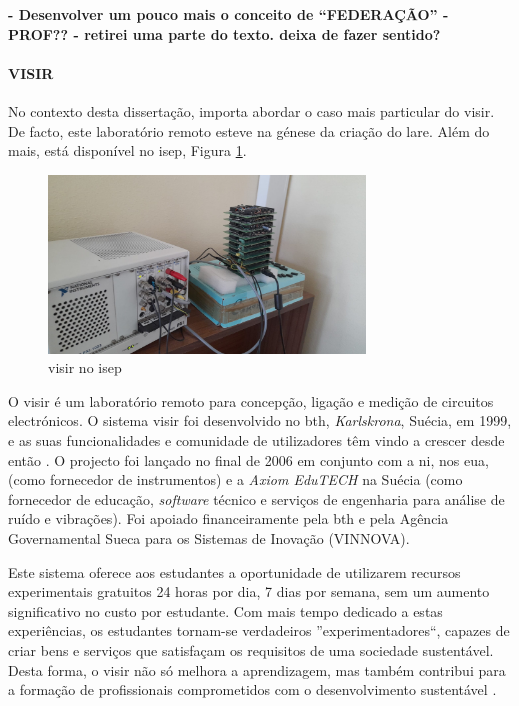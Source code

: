 \textbf{- Desenvolver um pouco mais o conceito de ``FEDERAÇÃO'' - PROF?? - retirei uma parte do texto. deixa de fazer sentido?}

\paragraph{VISIR}
\label{sec:visir}
No contexto desta dissertação, importa abordar o caso mais particular do \acrshort{visir}. De facto, este \acrshort{laboratório remoto} esteve na génese da criação do \acrshort{lare}. Além do mais, está disponível no \acrshort{isep}, Figura \ref{fig:visirISEP}. 

\begin{figure}[hbtp]
    \centering
    \includegraphics[width=0.75\textwidth]{figures/visirISEP.jpeg}
    \caption{\acrshort{visir} no \acrshort{isep}}
    \label{fig:visirISEP}
\end{figure}

O \acrshort{visir} é um \acrshort{laboratório remoto} para concepção, ligação e medição de circuitos electrónicos. O sistema \acrshort{visir} foi desenvolvido no \acrfull{bth}, \textit{Karlskrona}, Suécia, em 1999, e as suas funcionalidades e comunidade de utilizadores têm vindo a crescer desde então \cite{RemoteLabsImpactVISIR}. O projecto foi lançado no final de 2006 em conjunto com a \acrshort{ni}, nos \acrshort{eua}, (como fornecedor de instrumentos) e a \textit{Axiom EduTECH} na Suécia (como fornecedor de educação, \textit{software} técnico e serviços de engenharia para análise de ruído e vibrações). Foi apoiado financeiramente pela \acrshort{bth} e pela Agência Governamental Sueca para os Sistemas de Inovação (VINNOVA)\cite{VISIRExperiencesChallenges}.

Este sistema oferece aos estudantes a oportunidade de utilizarem recursos experimentais gratuitos 24 horas por dia, 7 dias por semana, sem um aumento significativo no custo por estudante. Com mais tempo dedicado a estas experiências, os estudantes tornam-se verdadeiros ''experimentadores``, capazes de criar bens e serviços que satisfaçam os requisitos de uma sociedade sustentável. Desta forma, o \acrshort{visir} não só melhora a aprendizagem, mas também contribui para a formação de profissionais comprometidos com o desenvolvimento sustentável \cite{OpenLabs77:online}.

